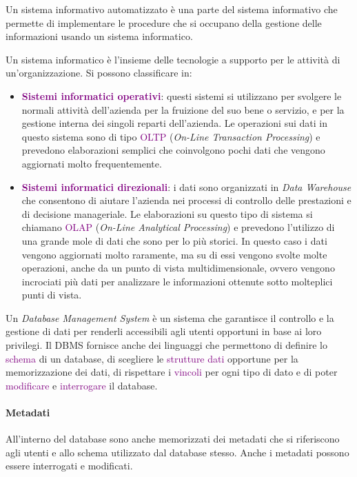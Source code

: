     \begin{definition}
        Un sistema informativo automatizzato è una parte del sistema informativo che permette di implementare le procedure
        che si occupano della gestione delle informazioni usando un sistema informatico.
    \end{definition}

    \begin{definition}
        Un sistema informatico è l'insieme delle tecnologie a supporto per le attività di un'organizzazione.
        Si possono classificare in:
        \begin{itemize}
            \item \textbf{\textcolor{purple}{Sistemi informatici operativi}}: questi sistemi si utilizzano per svolgere le normali attività dell'azienda
                per la fruizione del suo bene o servizio, e per la gestione interna dei singoli reparti dell'azienda.
                Le operazioni sui dati in questo sistema sono di tipo \textcolor{purple}{OLTP} (\emph{On-Line Transaction Processing})
                e prevedono elaborazioni semplici che coinvolgono pochi dati che vengono aggiornati molto frequentemente.
            \item \textbf{\textcolor{purple}{Sistemi informatici direzionali}}: i dati sono organizzati in \emph{Data Warehouse}
                che consentono di aiutare l'azienda nei processi di controllo delle prestazioni e di decisione manageriale.
                Le elaborazioni su questo tipo di sistema si chiamano \textcolor{purple}{OLAP} (\emph{On-Line Analytical Processing})
                e prevedono l'utilizzo di una grande mole di dati che sono per lo più storici. In questo caso i dati vengono aggiornati
                molto raramente, ma su di essi vengono svolte molte operazioni, anche da un punto di vista multidimensionale, ovvero
                vengono incrociati più dati per analizzare le informazioni ottenute sotto molteplici punti di vista.
        \end{itemize}
    \end{definition}

    \begin{definition}[DBMS]
        Un \emph{Database Management System} è un sistema che garantisce
        il controllo e la gestione di dati per renderli accessibili agli utenti opportuni in base ai loro privilegi.
        Il DBMS fornisce anche dei linguaggi che permettono di definire lo \textcolor{purple}{schema} di un database, di scegliere le \textcolor{purple}{strutture dati}
        opportune per la memorizzazione dei dati, di rispettare i \textcolor{purple}{vincoli} per ogni tipo di dato e di poter \textcolor{purple}{modificare} e
        \textcolor{purple}{interrogare} il database.
    \end{definition}

    \paragraph*{Metadati} All'interno del database sono anche memorizzati dei metadati che si riferiscono agli utenti
    e allo schema utilizzato dal database stesso. Anche i metadati possono essere interrogati e modificati.